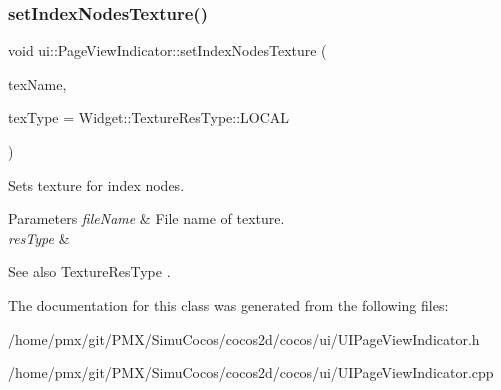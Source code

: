 \subsubsection{\texorpdfstring{set\+Index\+Nodes\+Texture()}{setIndexNodesTexture()}\hspace{0.1cm}{\footnotesize\ttfamily [2/2]}}
{\footnotesize\ttfamily void ui\+::\+Page\+View\+Indicator\+::set\+Index\+Nodes\+Texture (\begin{DoxyParamCaption}\item[{const std\+::string \&}]{tex\+Name,  }\item[{\hyperlink{classui_1_1Widget_a040a65ec5ad3b11119b7e16b98bd9af0}{Widget\+::\+Texture\+Res\+Type}}]{tex\+Type = {\ttfamily Widget\+:\+:TextureResType\+:\+:LOCAL} }\end{DoxyParamCaption})}

Sets texture for index nodes.


\begin{DoxyParams}{Parameters}
{\em file\+Name} & File name of texture. \\
\hline
{\em res\+Type} & \\
\hline
\end{DoxyParams}
\begin{DoxySeeAlso}{See also}
Texture\+Res\+Type . 
\end{DoxySeeAlso}


The documentation for this class was generated from the following files\+:\begin{DoxyCompactItemize}
\item 
/home/pmx/git/\+P\+M\+X/\+Simu\+Cocos/cocos2d/cocos/ui/U\+I\+Page\+View\+Indicator.\+h\item 
/home/pmx/git/\+P\+M\+X/\+Simu\+Cocos/cocos2d/cocos/ui/U\+I\+Page\+View\+Indicator.\+cpp\end{DoxyCompactItemize}
